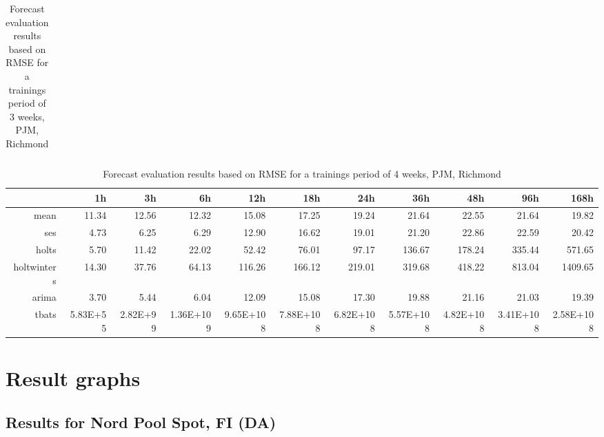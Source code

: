 \begin{landscape}
\begin{table}[ht]
\begin{tabular}{rrrrrrrrrrr}
   \hline
\end{tabular}
\caption{Forecast evaluation results based on RMSE for a trainings period of 3 weeks, PJM, Richmond}
\label{tab:app_results_richmond_3weeks}
\end{table}
\begin{table}[ht]
\centering
\begin{tabular}{rrrrrrrrrrr}
  \hline
 & 1h & 3h & 6h & 12h & 18h & 24h & 36h & 48h & 96h & 168h \\ 
  \hline
mean & 11.34 & 12.56 & 12.32 & 15.08 & 17.25 & 19.24 & 21.64 & 22.55 & 21.64 & 19.82 \\ 
  ses & 4.73 & 6.25 & 6.29 & 12.90 & 16.62 & 19.01 & 21.20 & 22.86 & 22.59 & 20.42 \\ 
  holts & 5.70 & 11.42 & 22.02 & 52.42 & 76.01 & 97.17 & 136.67 & 178.24 & 335.44 & 571.65 \\ 
  holtwinters & 14.30 & 37.76 & 64.13 & 116.26 & 166.12 & 219.01 & 319.68 & 418.22 & 813.04 & 1409.65 \\ 
  arima & 3.70 & 5.44 & 6.04 & 12.09 & 15.08 & 17.30 & 19.88 & 21.16 & 21.03 & 19.39 \\ 
  tbats & 5.83E+55 & 2.82E+99 & 1.36E+109 & 9.65E+108 & 7.88E+108 & 6.82E+108 & 5.57E+108 & 4.82E+108 & 3.41E+108 & 2.58E+108 \\ 
   \hline
\end{tabular}
\caption{Forecast evaluation results based on RMSE for a trainings period of 4 weeks, PJM, Richmond}
\label{tab:app_results_richmond_4weeks}
\vspace*{-0.4in}
\end{table}

\end{landscape}






\section{Result graphs} \label{sec:app_result_graphs}

\FloatBarrier
\subsection{Results for Nord Pool Spot, FI (DA)} \label{ssec:app_graphs_nord_pool_spot}


